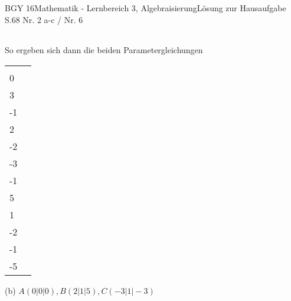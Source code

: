 \documentclass[oneside,openany,headings=optiontotoc,11pt,numbers=noenddot]{scrreprt}
\begin{document}
\begin{worksheet}{BGY 16}{Mathematik - Lernbereich 3, Algebraisierung}{Lösung zur Hausaufgabe S.68 Nr. 2 a-c / Nr. 6}
\begin{framed}
\begin{tabularx}{\textwidth}{X|X}
			\end{tabularx}
			So ergeben sich dann die beiden Parametergleichungen\\
			\par\noindent
			\begin{tabularx}{\textwidth}{X|X}
				\colorbox{green!10}{\(E_1: \vec{x} = \left(\begin{matrix}2\\0\\3\end{matrix}\right) + r*\left(\begin{matrix}-1\\-1\\2\end{matrix}\right) +s*\left(\begin{matrix}1\\-2\\-3\end{matrix}\right)\)} & \colorbox{green!10}{\(E_2: \vec{x} =  \left(\begin{matrix}1\\-1\\5\end{matrix}\right) + r*\left(\begin{matrix}1\\1\\-2\end{matrix}\right) + s*\left(\begin{matrix}2\\-1\\-5\end{matrix}\right)\)}\\
			\end{tabularx}
			\par\bigskip\noindent
			(b) \(A(0|0|0), B(2|1|5), C(-3|1|-3)\)\\
			\begin{tabularx}{\textwidth}{X|X}

\end{tabularx}
\end{framed}
\end{worksheet}
\end{document}
